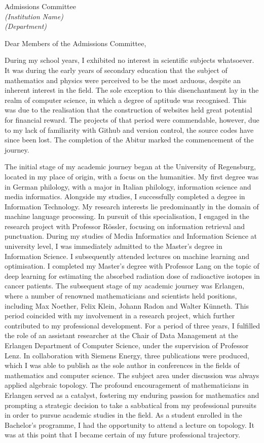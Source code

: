 \documentclass[11pt]{letter}
\begin{document}
\begin{letter}{%
Admissions Committee\\[2pt]%
\textit{(Institution Name)}\\%
\textit{(Department)}}

\opening{Dear Members of the Admissions Committee,}

During my school years, I exhibited no interest in scientific subjects whatsoever. It was during the early years of secondary education that the subject of mathematics and physics were perceived to be the most arduous, despite an inherent interest in the field. The sole exception to this disenchantment lay in the realm of computer science, in which a degree of aptitude was recognised. This was due to the realisation that the construction of websites held great potential for financial reward. The projects of that period were commendable, however, due to my lack of familiarity with Github and version control, the source codes have since been lost. The completion of the Abitur marked the commencement of the journey.

The initial stage of my academic journey began at the University of Regensburg, located in my place of origin, with a focus on the humanities. My first degree was in German philology, with a major in Italian philology, information science and media informatics. Alongside my studies, I successfully completed a degree in Information Technology. My research interests lie predominantly in the domain of machine language processing. In pursuit of this specialisation, I engaged in the research project with Professor Rössler, focusing on information retrieval and punctuation. During my studies of Media Informatics and Information Science at university level, I was immediately admitted to the Master's degree in Information Science. I subsequently attended lectures on machine learning and optimisation. I completed my Master's degree with Professor Lang on the topic of deep learning for estimating the absorbed radiation dose of radioactive isotopes in cancer patients. The subsequent stage of my academic journey was Erlangen, where a number of renowned mathematicians and scientists held positions, including Max Noether, Felix Klein, Johann Radon and Walter Künneth. This period coincided with my involvement in a research project, which further contributed to my professional development. For a period of three years, I fulfilled the role of an assistant researcher at the Chair of Data Management at the Erlangen Department of Computer Science, under the supervision of Professor Lenz. In collaboration with Siemens Energy, three publications were produced, which I was able to publish as the sole author in conferences in the fields of mathematics and computer science. The subject area under discussion was always applied algebraic topology. The profound encouragement of mathematicians in Erlangen served as a catalyst, fostering my enduring passion for mathematics and prompting a strategic decision to take a sabbatical from my professional pursuits in order to pursue academic studies in the field. As a student enrolled in the Bachelor's programme, I had the opportunity to attend a lecture on topology. It was at this point that I became certain of my future professional trajectory.


\end{letter}
\end{document}
